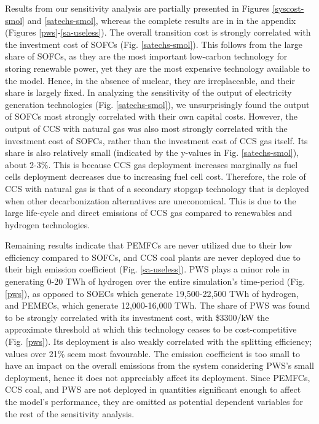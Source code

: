 Results from our sensitivity analysis are partially presented in Figures \ref{syscost-smol} and \ref{satechs-smol}, whereas the complete results are in in the appendix (Figures \ref{pws}-\ref{sa-useless}). The overall transition cost is strongly correlated with the investment cost of \gls{SOFC}s (Fig. \ref{satechs-smol}). This follows from the large share of \gls{SOFC}s, as they are the most important low-carbon technology for storing renewable power, yet they are the most expensive technology available to the model. Hence, in the absence of nuclear, they are irreplaceable, and their share is largely fixed. In analyzing the sensitivity of the output of electricity generation technologies (Fig. \ref{satechs-smol}), we unsurprisingly found the output of \gls{SOFC}s most strongly correlated with their own capital costs. However, the output of \gls{CCS} with natural gas was also most strongly correlated with the investment cost of \gls{SOFC}s, rather than the investment cost of CCS gas itself. Its share is also relatively small (indicated by the y-values in Fig. \ref{satechs-smol}), about 2-3\%.  This is because CCS gas deployment increases marginally as fuel cells deployment decreases due to increasing fuel cell cost. Therefore, the role of CCS with natural gas is that of a secondary stopgap technology that is deployed when other decarbonization alternatives are uneconomical. This is due to the large life-cycle and direct emissions of CCS gas compared to renewables and hydrogen technologies.

Remaining results indicate that \gls{PEMFC}s are never utilized due to their low efficiency compared to \gls{SOFC}s, and \gls{CCS} coal plants are never deployed due to their high emission coefficient (Fig. \ref{sa-useless}). \gls{PWS} plays a minor role in generating 0-20 TWh of hydrogen over the entire simulation's time-period (Fig. \ref{pws}), as opposed to \gls{SOEC}s which generate 19,500-22,500 TWh of hydrogen, and \gls{PEMEC}s, which generate 12,000-16,000 TWh. The share of \gls{PWS} was found to be strongly correlated with its investment cost, with \$3300/kW the approximate threshold at which this technology ceases to be cost-competitive (Fig. \ref{pws}). Its deployment is also weakly correlated with the splitting efficiency; values over 21\% seem most favourable. The emission coefficient is too small to have an impact on the overall emissions from the system considering \gls{PWS}'s small deployment, hence it does not appreciably affect its deployment. Since \gls{PEMFC}s, \gls{CCS} coal, and \gls{PWS} are not deployed in quantities significant enough to affect the model's performance, they are omitted as potential dependent variables for the rest of the sensitivity analysis.

